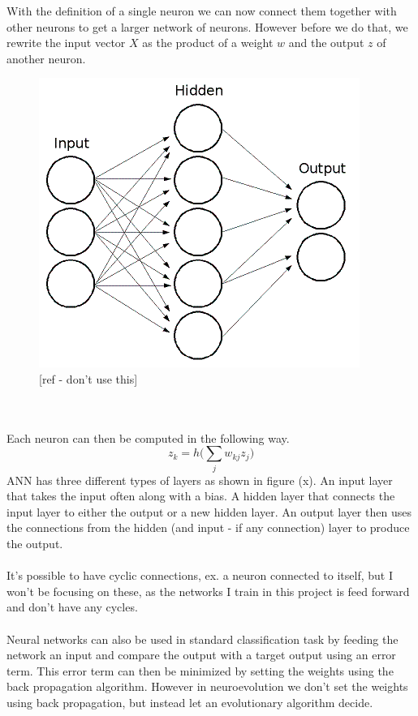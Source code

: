 \documentclass[11pt, a4paper]{article}
\begin{document}
With the definition of a single neuron we can now connect them together with other neurons to get a larger network of neurons. However before we do that, we rewrite the input vector $ X $ as the product of a weight $ w $ and the output $ z $ of another neuron.
\begin{figure}[!ht]
\centering
\includegraphics[scale=0.7]{NeuralNetwork}
\caption{[ref - don't use this]}
\end{figure}
\\
\\
Each neuron can then be computed in the following way.
\begin{equation}
z_k = h\Big(\sum\limits_{j}{w_{kj} z_j}\Big)
\end{equation}
ANN has three different types of layers as shown in figure (x). An input layer that takes the input often along with a bias. A hidden layer that connects the input layer to either the output or a new hidden layer. An output layer then uses the connections from the hidden (and input - if any connection) layer to produce the output. 
\\
\\
It's possible to have cyclic connections, ex. a neuron connected to itself, but I won't be focusing on these, as the networks I train in this project is feed forward and don't have any cycles. 
\\
\\
Neural networks can also be used in standard classification task by feeding the network an input and compare the output with a target output using an error term. This error term can then be minimized by setting the weights using the back propagation algorithm. However in neuroevolution we don't set the weights using back propagation, but instead let an evolutionary algorithm decide.
\end{document}

